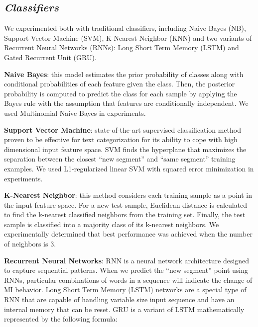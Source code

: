\documentclass{amia}
\begin{document}
\subsection*{\textit{Classifiers}}

We experimented both with traditional classifiers, including Naive Bayes (NB)\cite{mccallum1998comparison}, Support Vector Machine (SVM)\cite{cortes1995support}, K-Nearest Neighbor (KNN)\cite{keller1985fuzzy} and two variants of Recurrent Neural Networks (RNNs)\cite{lipton2015critical}: Long Short Term Memory (LSTM)\cite{hochreiter1997long} and Gated Recurrent Unit (GRU)\cite{chung2014empirical}. 

\textbf{Naive Bayes}: this model estimates the prior probability of classes along with conditional probabilities of each feature given the class. Then, the posterior probability is computed to predict the class for each sample by applying the Bayes rule with the assumption that features are conditionally independent. We used Multinomial Naive Bayes in experiments.

\textbf{Support Vector Machine}: state-of-the-art supervised classification method proven to be effective for text categorization\cite{joachims1998text} for its ability to cope with high dimensional input feature space. SVM finds the hyperplane that maximizes the separation between the closest ``new segment'' and ``same segment'' training examples. We used L1-regularized linear SVM with squared error minimization in experiments.   

\textbf{K-Nearest Neighbor}: this method considers each training sample as a point in the input feature space. For a new test sample, Euclidean distance is calculated to find the k-nearest classified neighbors from the training set. Finally, the test sample is classified into a majority class of its k-nearest neighbors. We experimentally determined that best performance was achieved when the number of neighbors is 3. 

\textbf{Recurrent Neural Networks}: RNN is a neural network architecture designed to capture sequential patterns. When we predict the ``new segment'' point using RNNs, particular combinations of words in a sequence will indicate the change of MI behavior. Long Short Term Memory (LSTM) networks\cite{hochreiter1997long} are a special type of RNN that are capable of handling variable size input sequence and have an internal memory that can be reset. GRU\cite{chung2014empirical} is a variant of LSTM mathematically represented by the following formula:
\end{document}
